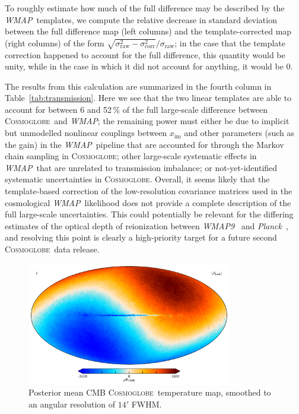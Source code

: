\documentclass[twocolumn]{../../common/aa}
\def\WMAP{\emph{WMAP}}
\def\WMAPnine{\emph{WMAP9}}
\def\Planck{\emph{Planck}}
\newcommand{\cosmoglobe}{\textsc{Cosmoglobe}}
\begin{document}
To roughly estimate how much of the full difference may be described by the \WMAP\ templates, we compute the relative decrease in standard deviation between the full difference map (left columns) and the template-corrected map (right columns) of the form $\sqrt{\sigma_{\mathrm{raw}}^2 - \sigma_{\mathrm{corr}}^2}/\sigma_{\mathrm{raw}}$; in the case that the template correction happened to account for the full difference, this quantity would be unity, while in the case in which it did not account for anything, it would be 0.


The results from this calculation are summarized in the fourth column in Table~\ref{tab:transmission}. Here we see that the two linear templates are able to account for between 6 and 52\,\% of the full large-scale difference between \cosmoglobe\ and \WMAP; the remaining power must either be due to implicit but unmodelled nonlinear couplings between $x_{\mathrm{im}}$ and other parameters (such as the gain) in the \WMAP\ pipeline that are accounted for through the Markov chain sampling in \cosmoglobe; other large-scale systematic effects in \WMAP\ that are unrelated to transmission imbalance; or not-yet-identified systematic uncertainties in \cosmoglobe. Overall, it seems likely that the template-based correction of the low-resolution covariance matrices used in the cosmological \WMAP\ likelihood does not provide a complete description of the full large-scale uncertainties. This could potentially be relevant for the differing estimates of the optical depth of reionization between \WMAPnine\ \citep{hinshaw2012} and \Planck\ \citep{planck2016-l05}, and resolving this point is clearly a high-priority target for a future second \cosmoglobe\ data release.

\begin{figure}
	\centering
	\includegraphics[width=0.8\textwidth]{figures/cmb_I_dipole.pdf}
	\caption{Posterior mean CMB \cosmoglobe\ temperature map, smoothed to an angular resolution of $14'$ FWHM.}
        \label{fig:cmb_mean}
\end{figure}
\end{document}
